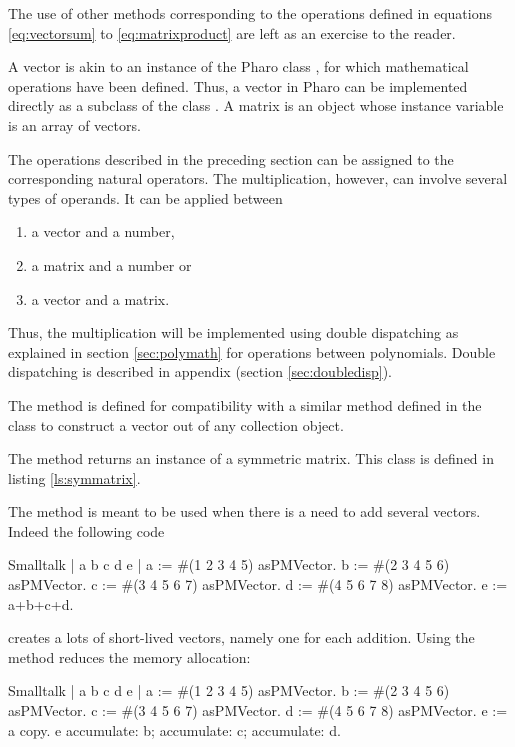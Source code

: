 The use of other methods corresponding to the operations defined
in equations \ref{eq:vectorsum} to \ref{eq:matrixproduct} are left
as an exercise to the reader.

 A vector is akin to an instance of the
Pharo class , for which mathematical operations
have been defined.
Thus, a vector in Pharo can be implemented directly as a subclass of the class .
A matrix is an object whose instance variable is an array of vectors.

The operations described in the preceding section can be assigned
to the corresponding natural operators. The multiplication,
however, can involve several types of operands. It can be applied
between
\begin{enumerate}
  \item a vector and a number,
  \item a matrix and a number or
  \item a vector and a matrix.
\end{enumerate}
Thus, the multiplication will be implemented using double
dispatching as explained in section \ref{sec:polymath} for
operations between polynomials. Double dispatching is described in
appendix (\cf section \ref{sec:doubledisp}).

The method  is defined for compatibility with a
similar method defined in the class  to construct a
vector out of any collection object.

The method  returns an instance of a symmetric
matrix.
This class is defined in listing \ref{ls:symmatrix}.

The method  is meant to be used when there is a
need to add several vectors.
Indeed the following code
\begin{displaycode}{Smalltalk}
| a b c d e |
a := #(1 2 3 4 5) asPMVector.
b := #(2 3 4 5 6) asPMVector.
c := #(3 4 5 6 7) asPMVector.
d := #(4 5 6 7 8) asPMVector.
e := a+b+c+d.
\end{displaycode}
creates a lots of short-lived vectors, namely one
for each addition.
Using the method  reduces the memory allocation:
\begin{displaycode}{Smalltalk}
| a b c d e |
a := #(1 2 3 4 5) asPMVector.
b := #(2 3 4 5 6) asPMVector.
c := #(3 4 5 6 7) asPMVector.
d := #(4 5 6 7 8) asPMVector.
e := a copy.
e accumulate: b; accumulate: c; accumulate: d.
\end{displaycode}

